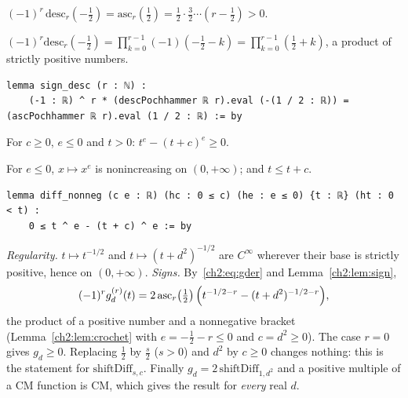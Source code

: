 \begin{lemma}\label{ch2:lem:sign}
$(-1)^r\,\mathrm{desc}_r(-\tfrac12)=\mathrm{asc}_r(\tfrac12)=\tfrac12\cdot\tfrac32\cdots\left(r-\tfrac12\right)>0$.
\end{lemma}
\begin{humanproof}
$(-1)^r\mathrm{desc}_r(-\tfrac12)=\prod_{k=0}^{r-1}(-1)\left(-\tfrac12-k\right)=\prod_{k=0}^{r-1}\left(\tfrac12+k\right)$,
a product of strictly positive numbers.
\end{humanproof}
\begin{leanbox}
\begin{lstlisting}[style=chdeux]
lemma sign_desc (r : ℕ) :
    (-1 : ℝ) ^ r * (descPochhammer ℝ r).eval (-(1 / 2 : ℝ)) = (ascPochhammer ℝ r).eval (1 / 2 : ℝ) := by
\end{lstlisting}
\end{leanbox}

\begin{lemma}\label{ch2:lem:crochet}
For $c\ge0$, $e\le0$ and $t>0$: $t^e-(t+c)^e\ge0$.
\end{lemma}
\begin{humanproof}
For $e\le0$, $x\mapsto x^e$ is nonincreasing on $(0,+\infty)$; and $t\le t+c$.
\end{humanproof}
\begin{leanbox}
\begin{lstlisting}[style=chdeux]
lemma diff_nonneg (c e : ℝ) (hc : 0 ≤ c) (he : e ≤ 0) {t : ℝ} (ht : 0 < t) :
    0 ≤ t ^ e - (t + c) ^ e := by
\end{lstlisting}
\end{leanbox}

\begin{humanproof}
\emph{Regularity.} $t\mapsto t^{-1/2}$ and $t\mapsto(t+d^2)^{-1/2}$ are $C^\infty$ wherever their base is strictly
positive, hence on $(0,+\infty)$.
\emph{Signs.} By~\eqref{ch2:eq:gder} and Lemma~\ref{ch2:lem:sign},
\[(-1)^rg_d^{(r)}(t)=2\,\mathrm{asc}_r\!\left(\tfrac12\right)\Bigl(t^{-1/2-r}-(t+d^2)^{-1/2-r}\Bigr),\]
the product of a positive number and a nonnegative bracket (Lemma~\ref{ch2:lem:crochet} with $e=-\tfrac12-r\le0$ and
$c=d^2\ge0$). The case $r=0$ gives $g_d\ge0$. Replacing $\tfrac12$ by $\tfrac s2$ ($s>0$) and $d^2$ by $c\ge0$ changes
nothing: this is the statement for $\mathrm{shiftDiff}_{s,c}$. Finally $g_d=2\,\mathrm{shiftDiff}_{1,d^2}$ and a positive
multiple of a CM function is CM, which gives the result for \emph{every} real $d$.
\end{humanproof}

